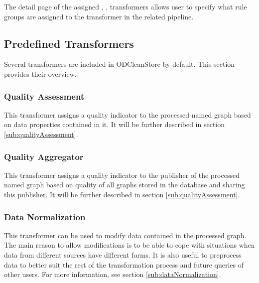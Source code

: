 	The detail page of the assigned \QA, \DN, \OI transformers allows user to specify what rule groups are assigned to the transformer in the related pipeline.


\subsection{Predefined Transformers}
Several transformers are included in ODCleanStore by default. This section provides their overview.

\subsubsection{Quality Assessment}

This transformer assigns a quality indicator to the processed named graph based on data properties contained in it. It will be further described in section \ref{sub:qualityAssessment}.

\subsubsection{Quality Aggregator}

This transformer assigns a quality indicator to the publisher of the processed named graph based on quality of all graphs stored in the database and sharing this publisher. It will be further described in section \ref{sub:qualityAssessment}.

\subsubsection{Data Normalization}

This transformer can be used to modify data contained in the processed graph. The main reason to allow modifications is to be able to cope with situations when data from different sources have different forms. It is also useful to preprocess data to better suit the rest of the transformation process and future queries of other users. For more information, see section \ref{sub:dataNormalization}.

